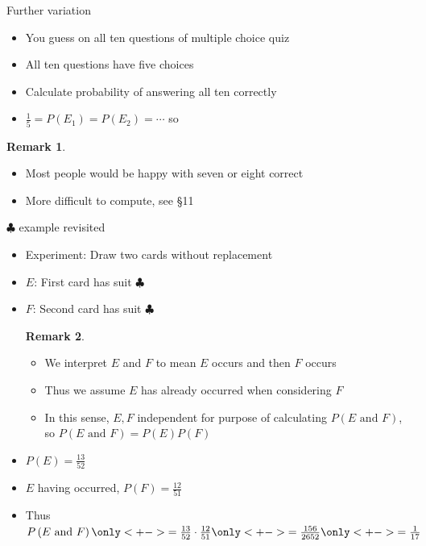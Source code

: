 \documentclass[handout]{beamer}
\theoremstyle{definition}
\newtheorem{remark}{Remark}
\begin{document}
\begin{frame}{Further variation}
\begin{itemize}
\item You guess on all ten questions of multiple choice quiz
\item All ten questions have five choices
\item Calculate probability of answering all ten correctly
\item $\frac{1}{5}=P\left(E_1\right)=P\left(E_2\right)=\cdots$ so
\end{itemize}
\begin{remark}
\begin{itemize}
\item Most people would be happy with seven or eight correct
\item More difficult to compute, see \S11
\end{itemize}
\end{remark}
\end{frame}

\begin{frame}{$\clubsuit$ example revisited}
\begin{itemize}
\item Experiment: Draw two cards without replacement
\item $E$: First card has suit $\clubsuit$
\item $F$: Second card has suit $\clubsuit$
\begin{remark}
\begin{itemize}
\item We interpret \alert{$E$ and $F$} to mean $E$ occurs
\alert{and then} $F$ occurs
\item Thus we assume $E$ has already occurred when considering $F$
\item In this sense, $E,F$ \alert{independent} for purpose of calculating
$P\left(\text{$E$ and $F$}\right)$, so
$P\left(\text{$E$ and $F$}\right)=P\left(E\right)P\left(F\right)$
\end{itemize}
\end{remark}
\item $P\left(E\right)=\frac{13}{52}$
\item $E$ having occurred, $P\left(F\right)=\frac{12}{51}$
\item Thus $P\left(\text{$E$ and $F$}\right)
\only<+->{=\frac{13}{52}\cdot\frac{12}{51}}
\only<+->{=\frac{156}{2652}}\only<+->{=\frac{1}{17}}$
\end{itemize}
\end{frame}
\end{document}
